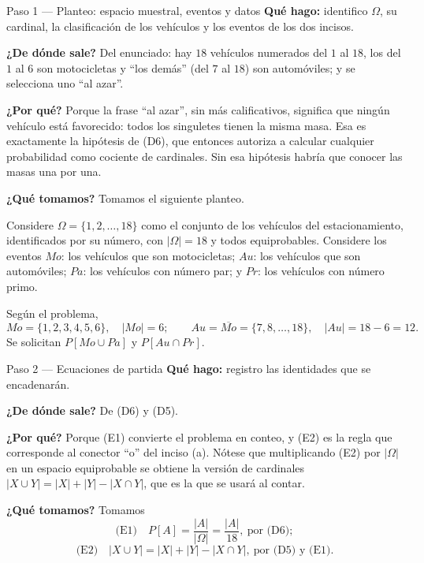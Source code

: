 \documentclass[11pt]{article}
\begin{document}
\begin{sol}

\begin{paso}{Paso 1 --- Planteo: espacio muestral, eventos y datos}
\textbf{Qué hago:} identifico $\Omega$, su cardinal, la clasificación de los vehículos y los
eventos de los dos incisos.

\textbf{¿De dónde sale?} Del enunciado: hay $18$ vehículos numerados del $1$ al $18$, los del
$1$ al $6$ son motocicletas y ``los demás'' (del $7$ al $18$) son automóviles; y se selecciona
uno ``al azar''.

\textbf{¿Por qué?} Porque la frase ``al azar'', sin más calificativos, significa que ningún
vehículo está favorecido: todos los singuletes tienen la misma masa. Esa es exactamente la
hipótesis de (D6), que entonces autoriza a calcular cualquier probabilidad como cociente de
cardinales. Sin esa hipótesis habría que conocer las masas una por una.

\textbf{¿Qué tomamos?} Tomamos el siguiente planteo.

\medskip
Considere $\Omega=\{1,2,\dots,18\}$ como el conjunto de los vehículos del estacionamiento,
identificados por su número, con $|\Omega|=18$ y todos equiprobables. Considere los eventos
$Mo$: los vehículos que son motocicletas; $Au$: los vehículos que son automóviles; $Pa$: los
vehículos con número par; y $Pr$: los vehículos con número primo.

Según el problema,
\[
Mo=\{1,2,3,4,5,6\},\quad |Mo|=6;
\qquad
Au=\overline{Mo}=\{7,8,\dots,18\},\quad |Au|=18-6=12 .
\]
Se solicitan $P[Mo\cup Pa]$ y $P[Au\cap Pr]$.
\end{paso}

\begin{paso}{Paso 2 --- Ecuaciones de partida}
\textbf{Qué hago:} registro las identidades que se encadenarán.

\textbf{¿De dónde sale?} De (D6) y (D5).

\textbf{¿Por qué?} Porque (E1) convierte el problema en conteo, y (E2) es la regla que
corresponde al conector ``o'' del inciso (a). Nótese que multiplicando (E2) por $|\Omega|$ en un
espacio equiprobable se obtiene la versión de cardinales
$|X\cup Y|=|X|+|Y|-|X\cap Y|$, que es la que se usará al contar.

\textbf{¿Qué tomamos?} Tomamos
\[
\text{(E1)}\quad P[A]=\frac{|A|}{|\Omega|}=\frac{|A|}{18},\ \text{por (D6)};
\]
\[
\text{(E2)}\quad |X\cup Y|=|X|+|Y|-|X\cap Y|,\ \text{por (D5) y (E1)}.
\]
\end{paso}


\end{sol}
\end{document}
